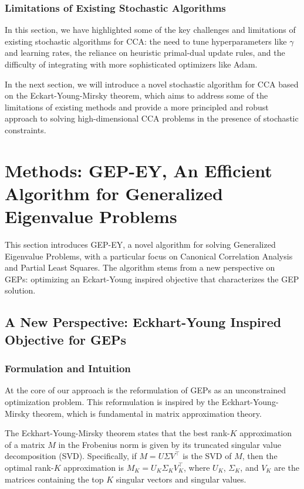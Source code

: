 \subsubsection{Limitations of Existing Stochastic Algorithms}

In this section, we have highlighted some of the key challenges and limitations of existing stochastic algorithms for CCA: the need to tune hyperparameters like $\gamma$ and learning rates, the reliance on heuristic primal-dual update rules, and the difficulty of integrating with more sophisticated optimizers like Adam.

In the next section, we will introduce a novel stochastic algorithm for CCA based on the Eckart-Young-Mirsky theorem, which aims to address some of the limitations of existing methods and provide a more principled and robust approach to solving high-dimensional CCA problems in the presence of stochastic constraints.

\section{Methods: GEP-EY, An Efficient Algorithm for Generalized Eigenvalue Problems}\label{sec:contributions}
This section introduces GEP-EY, a novel algorithm for solving Generalized Eigenvalue Problems, with a particular focus on Canonical Correlation Analysis and Partial Least Squares. The algorithm stems from a new perspective on GEPs: optimizing an Eckart-Young inspired objective that characterizes the GEP solution.

\subsection{A New Perspective: Eckhart-Young Inspired Objective for GEPs}

\subsubsection{Formulation and Intuition}
At the core of our approach is the reformulation of GEPs as an unconstrained optimization problem. This reformulation is inspired by the Eckhart-Young-Mirsky theorem, which is fundamental in matrix approximation theory.

The Eckhart-Young-Mirsky theorem states that the best rank-$K$ approximation of a matrix \(M\) in the Frobenius norm is given by its truncated singular value decomposition (SVD). Specifically, if \(M = U \Sigma V^\top\) is the SVD of \(M\), then the optimal rank-$K$ approximation is \(M_K = U_K \Sigma_K V_K^\top\), where \(U_K\), \(\Sigma_K\), and \(V_K\) are the matrices containing the top $K$ singular vectors and singular values.

